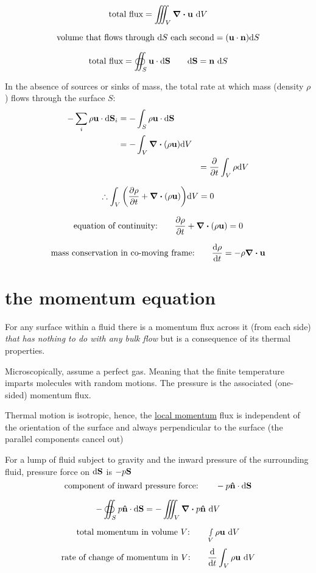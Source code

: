 \documentclass[10pt, a4paper, twocolumn]{article}
\begin{document}
\[\text{total flux}
=\iiint_V \div \vb u \ \dd V
\]

\[\text{volume that flows through $\dd S$ each second}
=(\vb u\cdot \vb n)\dd S\]

\[\text{total flux}
=\oiint _S \vb u\cdot \vb{\dd S}
\qquad \dd \vb S = \vb n\ \dd S
\]

In the absence of sources or sinks of mass,
the total rate at which mass (density $\rho$) flows through the surface $S$:
\begin{equation*}
\begin{aligned}
-\sum _i\rho\vb u\cdot \dd \vb S_i
&=-\int _S\rho\vb u\cdot \dd \vb S
\\&=-\int _V\div{(\rho\vb u)} \dd V &
\\&&=\pdv{t}\int _V \rho\dd V
\end{aligned}
\end{equation*}

\[\therefore
\int _V\pqty{\pdv{\rho}{t}+\div{(\rho \vb u)}}\dd V=0
\]

\[\text{equation of continuity:}\qquad
\pdv{\rho}{t}+\div{(\rho\vb u)}=0\]

\[\text{mass conservation in co-moving frame:}\qquad
\dv{\rho}{t}=-\rho\div\vb u\]

\section{the momentum equation}

For any surface within a fluid there is a momentum flux across it (from each side)
\emph{that has nothing to do with any bulk flow} but is a consequence of its thermal properties.

Microscopically, assume a perfect gas. Meaning that the finite temperature imparts molecules with random motions.
The pressure is the associated (one-sided) momentum flux.

Thermal motion is isotropic, hence, the \underline{local momentum} flux is
independent of the orientation of the surface and always perpendicular to the surface (the parallel components cancel out)

For a lump of fluid subject to gravity and the inward pressure of the surrounding fluid,
pressure force on $\dd\vb S$ is $-p\vb S$
\[\text{component of inward pressure force:}\qquad
-p\vb{\hat n}\cdot \dd \vb S\]

\[-\oiint _Sp\vb{\hat n}\cdot \dd\vb S
=-\iiint _V \div{p\vb{\hat n}}\ \dd V\]

\[\text{total momentum in volume $V$:}\qquad
\smallint _V\rho\vb u\ \dd V\]
\[\text{rate of change of momentum in $V$:}\qquad
\dv{t}\int_V\rho\vb u\ \dd V\]
\end{document}
